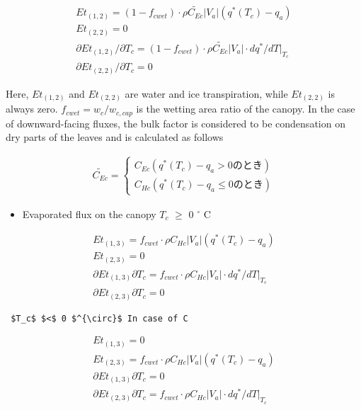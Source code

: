 \begin{eqnarray}
 Et_{(1,2)} = (1-f_{cwet}) \cdot \rho \widetilde{C_{Ec}}|V_a|(q^*(T_c) - q_a) \\
 Et_{(2,2)} = 0 \\
 \partial Et_{(1,2)}/\partial T_c =
  (1-f_{cwet}) \cdot \rho \widetilde{C_{Ec}}|V_a|\cdot dq^*/dT|_{T_c} \\
 \partial Et_{(2,2)}/\partial T_c = 0
\end{eqnarray}

Here, \(Et_{(1,2)}\) and \(Et_{(2,2)}\) are water and ice transpiration,
while \(Et_{(2,2)}\) is always zero. \(f_{cwet} = w_c / w_{c,cap}\) is
the wetting area ratio of the canopy. In the case of downward-facing
fluxes, the bulk factor is considered to be condensation on dry parts of
the leaves and is calculated as follows

\begin{eqnarray}
  \widetilde{C_{Ec}} = \left\{
  \begin{array}{ll}
   C_{Ec} (q^*(T_c) - q_a > 0 {のとき})\\
   C_{Hc} (q^*(T_c) - q_a \leq 0 {のとき})
  \end{array}
  \right.
\end{eqnarray}

\begin{itemize}
\tightlist
\item
  Evaporated flux on the canopy \(T_c\) \(\geq\) 0 \(^{\circ}\) C
\end{itemize}

\begin{eqnarray}
 Et_{(1,3)} =
  f_{cwet} \cdot \rho C_{Hc}|V_a|(q^*(T_c) - q_a) \\
 Et_{(2,3)} = 0 \\
 \partial Et_{(1,3)} \partial T_c =
  f_{cwet} \cdot \rho C_{Hc}|V_a|\cdot dq^*/dT|_{T_c} \\
 \partial Et_{(2,3)} \partial T_c = 0
\end{eqnarray}

\begin{verbatim}
 $T_c$ $<$ 0 $^{\circ}$ In case of C
\end{verbatim}

\begin{eqnarray}
 Et_{(1,3)} = 0 \\
 Et_{(2,3)} =
  f_{cwet} \cdot \rho C_{Hc}|V_a|(q^*(T_c) - q_a) \\
 \partial Et_{(1,3)} \partial T_c = 0 \\
 \partial Et_{(2,3)} \partial T_c =
  f_{cwet} \cdot \rho C_{Hc}|V_a|\cdot dq^*/dT|_{T_c}
\end{eqnarray}

